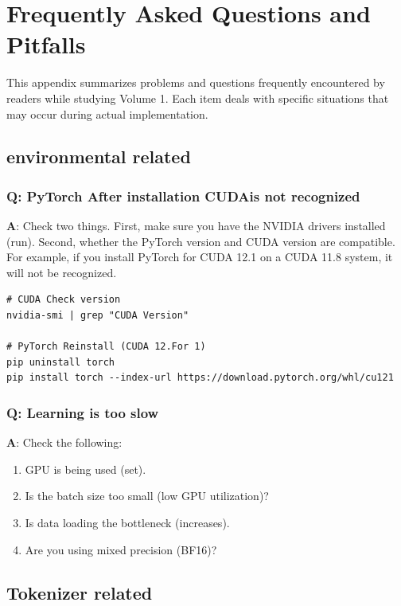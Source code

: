 \chapter{Frequently Asked Questions and Pitfalls}
\label{app:faq}

This appendix summarizes problems and questions frequently encountered by readers while studying Volume 1. Each item deals with specific situations that may occur during actual implementation.

\section{environmental related}

\subsection{Q: PyTorch After installation CUDAis not recognized}

\textbf{A}: Check two things. First, make sure you have the NVIDIA drivers installed (run). Second, whether the PyTorch version and CUDA version are compatible. For example, if you install PyTorch for CUDA 12.1 on a CUDA 11.8 system, it will not be recognized.

\begin{lstlisting}[style=bashstyle]
# CUDA Check version
nvidia-smi | grep "CUDA Version"

# PyTorch Reinstall (CUDA 12.For 1)
pip uninstall torch
pip install torch --index-url https://download.pytorch.org/whl/cu121
\end{lstlisting}

\subsection{Q: Learning is too slow}

\textbf{A}: Check the following:
\begin{enumerate}
\item GPU is being used (set).
\item Is the batch size too small (low GPU utilization)?
\item Is data loading the bottleneck (increases).
\item Are you using mixed precision (BF16)?
\end{enumerate}

\section{Tokenizer related}

